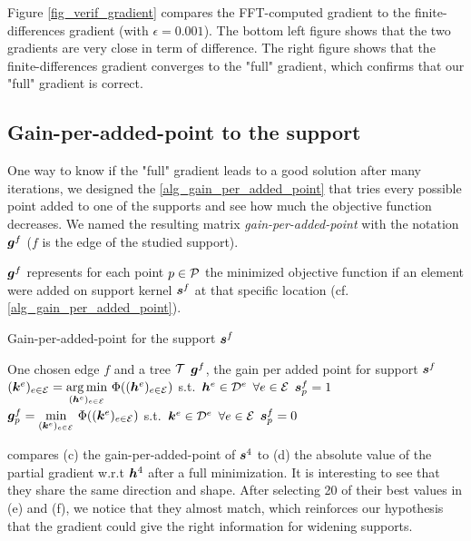 Figure \ref{fig_verif_gradient} compares the FFT-computed gradient to the finite-differences gradient (with $\epsilon=0.001$). The bottom left figure shows that the two gradients are very close in term of difference. The right figure shows that the finite-differences gradient converges to the "full" gradient, which confirms that our "full" gradient is correct.

\subsection{Gain-per-added-point to the support}\label{sec_gain_per_added_point}

One way to know if the "full" gradient leads to a good solution after many iterations, we designed the \cref{alg_gain_per_added_point} that tries every possible point added to one of the supports and see how much the objective function decreases. We named the resulting matrix \emph{gain-per-added-point} with the notation $\g^f$ ($f$ is the edge of the studied support).

$\g^f$ represents for each point $p \in \P$ the minimized objective function if an element were added on support kernel $\s^f$ at that specific location (cf. \cref{alg_gain_per_added_point}).

\begin{algorithm}[!ht]
    \caption{Gain-per-added-point for the support $\s^f$} \label{alg_gain_per_added_point}
  \begin{algorithmic}[1]
    \Input One chosen edge $f$ and a tree $\T$
    \Output $\g^f$, the gain per added point for support $\s^f$
    \State $(\k^e)_{e \in \E} = \underset{(\h^e)_{e \in \E}}{\arg\min}~ \Phi ((\h^e)_{e \in \E})$ \quad s.t.~$\h^e \in \Dspace^e$ \quad $\forall e \in \E$ 
    	\State $\s^f_p = 1$ 
    	\State $\g^f_p = \underset{(\k^e)_{e \in \E}}{\min}~ \Phi ((\k^e)_{e \in \E})$ \quad s.t.~$\k^e \in \Dspace^e$ \quad $\forall e \in \E$
    	\State $\s^f_p = 0$ 
    \EndFor
  \end{algorithmic}
\end{algorithm}

 compares (c) the gain-per-added-point of $\s^4$ to (d) the absolute value of the partial gradient w.r.t $\h^4$ after a full minimization. It is interesting to see that they share the same direction and shape. After selecting 20 of their best values in (e) and (f), we notice that they almost match, which reinforces our hypothesis that the gradient could give the right information for widening supports.

